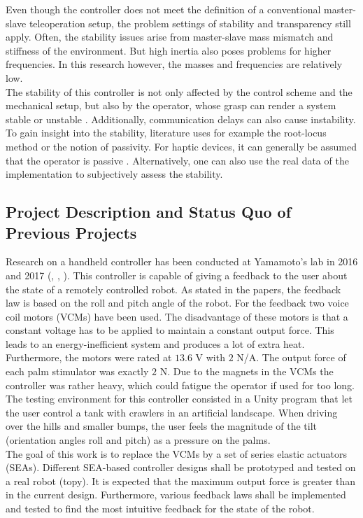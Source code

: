 Even though the controller does not meet the definition of a conventional master-slave teleoperation setup, the problem settings of stability and transparency still apply.  Often, the stability issues arise from master-slave mass mismatch and stiffness of the environment. But high inertia also poses problems for higher frequencies. In this research however, the masses and frequencies are relatively low. \\
The stability of this controller is not only affected by the control scheme and the mechanical setup, but also by the operator, whose grasp can render a system stable or unstable \cite{Enayati2016}. Additionally, communication delays can also cause instability.\\
To gain insight into the stability, literature uses for example the root-locus method \cite{Christiansson2006} or the notion of passivity. For haptic devices, it can generally be assumed that the operator is passive \cite{Hogan1989}. Alternatively, one can also use the real data of the implementation to subjectively assess the stability. %

\subsection{Project Description and Status Quo of Previous Projects}
Research on a handheld controller has been conducted at Yamamoto's lab in 2016 and 2017 (\cite{Asada2016}, \cite{Asada2016a}, \cite{Nakamura2016}). This controller is capable of giving a feedback to the user about the state of a remotely controlled robot. As stated in the papers, the feedback law is based on the roll and pitch angle of the robot. For the feedback two voice coil motors (VCMs) have been used. The disadvantage of these motors is that a constant voltage has to be applied to maintain a constant output force. This leads to an energy-inefficient system and produces a lot of extra heat. Furthermore, the motors were rated at $13.6$ V with $2$ N/A. The output force of each palm stimulator was exactly $2$ N. Due to the magnets in the VCMs the controller was rather heavy, which could fatigue the operator if used for too long.\\
The testing environment for this controller consisted in a Unity program that let the user control a tank with crawlers in an artificial landscape. When driving over the hills and smaller bumps, the user feels the magnitude of the tilt (orientation angles roll and pitch) as a pressure on the palms. \\
The goal of this work is to replace the VCMs by a set of series elastic actuators (SEAs). Different SEA-based controller designs shall be prototyped and tested on a real robot (topy). It is expected that the maximum output force is greater than in the current design. Furthermore, various feedback laws shall be implemented and tested to find the most intuitive feedback for the state of the robot. 

